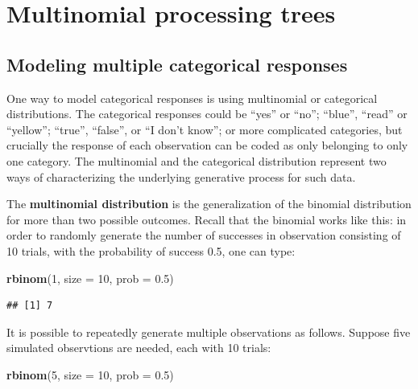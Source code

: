 \documentclass[12pt,]{krantz}
\newenvironment{Shaded}{\begin{snugshade}}{\end{snugshade}}
\newcommand{\DataTypeTok}[1]{\textcolor[rgb]{0.13,0.29,0.53}{#1}}
\newcommand{\DecValTok}[1]{\textcolor[rgb]{0.00,0.00,0.81}{#1}}
\newcommand{\FloatTok}[1]{\textcolor[rgb]{0.00,0.00,0.81}{#1}}
\newcommand{\KeywordTok}[1]{\textcolor[rgb]{0.13,0.29,0.53}{\textbf{#1}}}
\newcommand{\NormalTok}[1]{#1}
\theoremstyle{definition}
\theoremstyle{definition}
\theoremstyle{definition}
\theoremstyle{remark}
\begin{document}
\hypertarget{ch:MPT}{%
\chapter{Multinomial processing trees}\label{ch:MPT}}

\hypertarget{modeling-multiple-categorical-responses}{%
\section{Modeling multiple categorical responses}\label{modeling-multiple-categorical-responses}}

One way to model categorical responses is using multinomial or categorical distributions.
The categorical responses could be ``yes'' or ``no''; ``blue'', ``read'' or ``yellow''; ``true'', ``false'', or ``I don't know''; or more complicated categories, but crucially the response of each observation can be coded as only belonging to only one category. The multinomial and the categorical distribution represent two ways of characterizing the underlying generative process for such data.

The \textbf{multinomial distribution} is the generalization of the binomial distribution for more than two possible outcomes. Recall that the binomial works like this: in order to randomly generate the number of successes in observation consisting of 10 trials, with the probability of success 0.5, one can type:

\begin{Shaded}
\begin{Highlighting}[]
\KeywordTok{rbinom}\NormalTok{(}\DecValTok{1}\NormalTok{, }\DataTypeTok{size =} \DecValTok{10}\NormalTok{, }\DataTypeTok{prob =} \FloatTok{0.5}\NormalTok{)}
\end{Highlighting}
\end{Shaded}

\begin{verbatim}
## [1] 7
\end{verbatim}

It is possible to repeatedly generate multiple observations as follows. Suppose five simulated observtions are needed, each with 10 trials:

\begin{Shaded}
\begin{Highlighting}[]
\KeywordTok{rbinom}\NormalTok{(}\DecValTok{5}\NormalTok{, }\DataTypeTok{size =} \DecValTok{10}\NormalTok{, }\DataTypeTok{prob =} \FloatTok{0.5}\NormalTok{)}
\end{Highlighting}
\end{Shaded}
\end{document}

